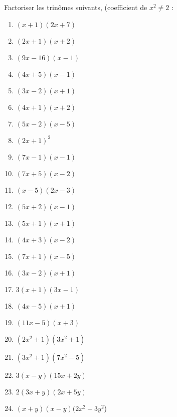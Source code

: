 \begin{solution}
Factoriser les trinômes suivants, (coefficient de $x^2 \neq 2$ : 
\begin{multicols}{2}
\begin{enumerate}
\item $(x+1)(2x+7)$
\item $(2x+1)(x+2)$
\item $(9x-16)(x-1)$
\item $(4x+5)(x-1)$
\item $(3x-2)(x+1)$
\item $(4x+1)(x+2)$
\item $(5x-2)(x-5)$
\item $(2x+1)^2$
\item $(7x-1)(x-1)$
\item  $(7x+5)(x-2)$
\item  $(x-5)(2x-3)$
\item  $(5x+2)(x-1)$
\item $(5x+1)(x+1)$
\item $(4x+3)(x-2)$
\item $(7x+1)(x-5)$
\item $(3x-2)(x+1)$
\item $3(x+1)(3x-1)$
\item  $(4x-5)(x+1)$
\item  $(11x-5)(x+3)$
\item  $(2x^2+1)(3x^2+1)$
\item $(3x^2+1)(7x^2-5)$
\item $3(x-y)(15x+2y)$
\item $2(3x+y)(2x+5y)$
\item $(x+y)(x-y)(2x^2+3y^2$)
\end{enumerate}
\end{multicols}
\end{solution}

